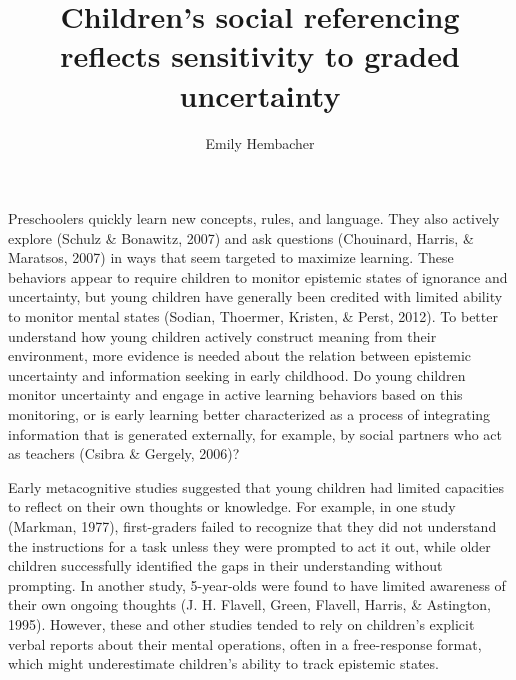 \documentclass[a4paper,man,apacite,floatsintext]{apa6}
\date{}
\title{\textbf{Children's social referencing reflects sensitivity to graded uncertainty}}
\author{Emily Hembacher}
\affiliation{Department of Psychology, Stanford University}
\begin{document}
\maketitle

Preschoolers quickly learn new concepts, rules, and language. They also
actively explore (Schulz \& Bonawitz, 2007) and ask questions
(Chouinard, Harris, \& Maratsos, 2007) in ways that seem targeted to
maximize learning. These behaviors appear to require children to monitor
epistemic states of ignorance and uncertainty, but young children have
generally been credited with limited ability to monitor mental states
(Sodian, Thoermer, Kristen, \& Perst, 2012). To better understand how
young children actively construct meaning from their environment, more
evidence is needed about the relation between epistemic uncertainty and
information seeking in early childhood. Do young children monitor
uncertainty and engage in active learning behaviors based on this
monitoring, or is early learning better characterized as a process of
integrating information that is generated externally, for example, by
social partners who act as teachers (Csibra \& Gergely, 2006)?

Early metacognitive studies suggested that young children had limited
capacities to reflect on their own thoughts or knowledge. For example,
in one study (Markman, 1977), first-graders failed to recognize that
they did not understand the instructions for a task unless they were
prompted to act it out, while older children successfully identified the
gaps in their understanding without prompting. In another study,
5-year-olds were found to have limited awareness of their own ongoing
thoughts (J. H. Flavell, Green, Flavell, Harris, \& Astington, 1995).
However, these and other studies tended to rely on children's explicit
verbal reports about their mental operations, often in a free-response
format, which might underestimate children's ability to track epistemic
states.
\end{document}
